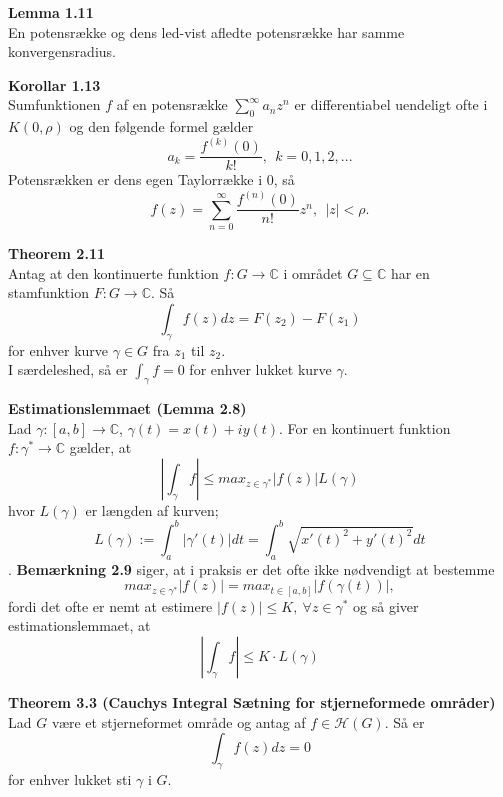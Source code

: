 \documentclass[10pt,a4paper]{article}
\theoremstyle{definition}
\begin{document}
\begin{framed}
\textbf{Lemma 1.11} \\
En potensrække og dens led-vist afledte potensrække har samme konvergensradius.
\end{framed}

\begin{framed}
\textbf{Korollar 1.13} \\
Sumfunktionen $f$ af en potensrække $\sum_0^\infty a_n z^n$ er differentiabel uendeligt ofte i $K(0,\rho)$ og den følgende formel gælder
$$ a_k = \frac{f^{(k)}(0)}{k!}, \ \ k= 0,1,2,...$$
Potensrækken er dens egen Taylorrække i 0, så
$$ f(z) = \sum_{n=0}^\infty \frac{f^{(n)} (0)}{n!} z^n, \ \ |z| < \rho.$$
\end{framed}

\begin{framed}
\textbf{Theorem 2.11} \\
Antag at den kontinuerte funktion $f : G \rightarrow \mathbb{C}$ i området $G \subseteq \mathbb{C}$ har en stamfunktion $F : G \rightarrow \mathbb{C}$. Så
$$ \int_\gamma f(z) dz = F(z_2) - F(z_1) $$
for enhver kurve $\gamma \in G$ fra $z_1$ til $z_2$. \\ 
I særdeleshed, så er $\int_\gamma f = 0$ for enhver lukket kurve $\gamma$.
\end{framed}

\begin{framed}
\textbf{Estimationslemmaet (Lemma 2.8)} \\
Lad $\gamma : [a,b] \rightarrow \mathbb{C}$, $\gamma(t) = x(t) + i y(t)$. For en kontinuert funktion $f : \gamma^* \rightarrow \mathbb{C}$ gælder, at
$$ \left| \int_\gamma f \right| \leq max_{z \in \gamma^*} \left| f(z) \right| L(\gamma)$$
hvor $L(\gamma)$ er længden af kurven;
$$ L(\gamma) := \int_a^b \left| \gamma'(t) \right| dt = \int_a^b \sqrt{x'(t)^2 + y'(t)^2}dt$$.
\textbf{Bemærkning 2.9} siger, at i praksis er det ofte ikke nødvendigt at bestemme
$$max_{z \in \gamma^*} \left| f(z) \right| = max_{t \in [a,b]} \left| f(\gamma(t))\right|,$$
fordi det ofte er nemt at estimere $\vert f(z) \vert \leq K, \ \forall z \in \gamma^*$ og så giver estimationslemmaet, at
$$\left| \int_\gamma f \right| \leq K \cdot L(\gamma)$$
\end{framed}

\begin{framed}
\textbf{Theorem 3.3 (Cauchys Integral Sætning for stjerneformede områder)} \\
Lad $G$ være et stjerneformet område og antag af $f \in \mathcal{H}(G)$. Så er 
$$ \int_\gamma f(z)dz = 0$$
for enhver lukket sti $\gamma$ i $G$.
\end{framed}
\end{document}

